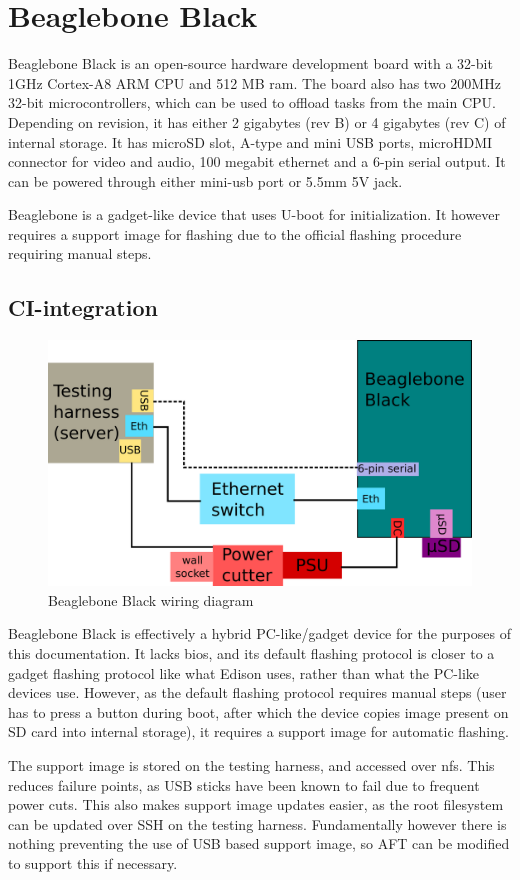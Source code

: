 \documentclass[a4paper,11pt]{article}
\begin{document}
\section{Beaglebone Black}
Beaglebone Black is an open-source hardware development board with a 32-bit 1GHz Cortex-A8 ARM CPU and 512 MB ram. The board also has two 200MHz 32-bit microcontrollers, which can be used to offload tasks from the main CPU. Depending on revision, it has either 2 gigabytes (rev B) or 4 gigabytes (rev C) of internal storage. It has microSD slot, A-type and mini USB ports, microHDMI connector for video and audio, 100 megabit ethernet and a 6-pin serial output. It can be powered through either mini-usb port or 5.5mm 5V jack.

Beaglebone is a gadget-like device that uses U-boot for initialization. It however requires a support image for flashing due to the official flashing procedure requiring manual steps.

\subsection{CI-integration}

\begin{figure}[h]
	\centering
	\includegraphics[width=0.7\linewidth]{beaglebonewiring.png}
	\caption{Beaglebone Black wiring diagram}
	\label{fig:minnowwiring}
\end{figure}

Beaglebone Black is effectively a hybrid PC-like/gadget device for the purposes of this documentation. It lacks bios, and its default flashing protocol is closer to a gadget flashing protocol like what Edison uses, rather than what the PC-like devices use. However, as the default flashing protocol requires manual steps (user has to press a button during boot, after which the device copies image present on SD card into internal storage), it requires a support image for automatic flashing.

The support image is stored on the testing harness, and accessed over nfs. This reduces failure points, as USB sticks have been known to fail due to frequent power cuts. This also makes support image updates easier, as the root filesystem can be updated over SSH on the testing harness. Fundamentally however there is nothing preventing the use of USB based support image, so AFT can be modified to support this if necessary.
\end{document}
